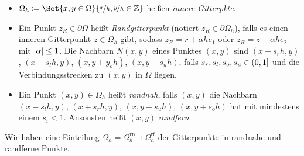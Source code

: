 \documentclass{cheat-sheet}
\newcommand{\bOmega}{\partial \Omega} %
\newcommand{\rn}{\text{rn}} %
\newcommand{\rf}{\text{rf}} %
\begin{document}
\begin{defn}
  \begin{itemize}
    \item $\Omega_h \coloneqq \Set{x, y \in \Omega}{\nicefrac{x}{h}, \nicefrac{y}{h} \in \Z}$ heißen \emph{innere Gitterpkte}.
    \item Ein Punkt $z_R \in \bOmega$ heißt \emph{Randgitterpunkt} (notiert $z_R \in \partial \Omega_h$), falls es einen inneren Gitterpunkt $z \in \Omega_h$ gibt, sodass $z_R = r + \alpha h e_1$ oder $z_R = z + \alpha h e_2$ mit $\lvert\alpha\rvert \leq 1$.
    Die Nachbarn $N(x, y)$ eines Punktes $(x, y)$ sind $(x + s_r h, y)$, $(x - s_l h, y)$, $(x, y + y_o h)$, $(x, y - s_u h) $, falls $s_r, s_l, s_o, s_u \in \left( 0, 1 \right]$ und die Verbindungsstrecken zu $(x, y)$ in $\Omega$ liegen.
    \item Ein Punkt $(x, y) \in \Omega_h$ heißt \emph{randnah}, falls $(x, y)$ die Nachbarn $(x - s_l h, y)$, $(x + s_r h, y)$, $(x, y - s_u h)$, $(x, y+ s_o h)$ hat mit mindestens einem $s_i < 1$.
    Ansonsten heißt $(x, y)$ \emph{randfern}.
  \end{itemize}
\end{defn}

\begin{nota}
  Wir haben eine Einteilung $\Omega_h = \Omega_h^\rn \sqcup \Omega_h^\rf$ der Gitterpunkte in randnahe und randferne Punkte.
\end{nota}
\end{document}
